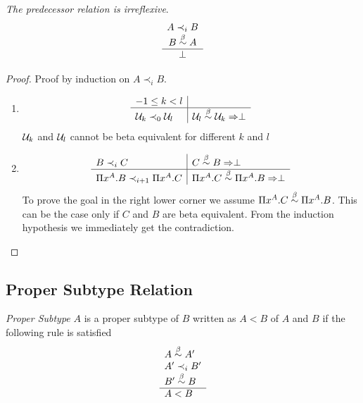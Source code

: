 \begin{lemma}
    \label{PrecedenceIrreflexive}
    \emph{The predecessor relation is irreflexive}.
    $$\begin{array}{c} A \prec_i B \\ B \stackrel{\beta}{\sim} A \\ \hline \perp\end{array}$$

    \begin{proof}
        Proof by induction on $A \prec_i B$.

        \begin{enumerate}
        \item
        $$
            \begin{array}{l|l}
                -1 \le k < l
                \\
                \hline
                {\cal U}_k \prec_0 {\cal U}_l
                &
                {\cal U}_l \stackrel{\beta}{\sim} {\cal U}_k \Rightarrow \perp
            \end{array}
        $$
        ${\cal U}_k$ and ${\cal U}_l$ cannot be beta equivalent for different $k$ and $l$


        \item
        $$
            \begin{array}{l|l}
                B \prec_i C
                &
                C \stackrel{\beta}{\sim} B \Rightarrow \perp
                \\
                \hline
                \Pi x^A. B \prec_{i+1} \Pi x^A. C
                &
                \Pi x^A. C \stackrel{\beta}{\sim} \Pi x^A. B \Rightarrow \perp
            \end{array}
        $$
        To prove the goal in the right lower corner we assume $\Pi x^A. C
        \stackrel{\beta}{\sim} \Pi x^A.B$. This can be the case only if $C$ and $B$ are
        beta equivalent. From the induction hypothesis we immediately
        get the contradiction.
        \end{enumerate}
    \end{proof}
\end{lemma}








\subsection{Proper Subtype Relation}



\begin{definition}
    \emph{Proper Subtype}
    $A$ is a proper subtype of $B$ written as $A < B$
    of $A$ and $B$ if the following rule is satisfied
    $$
    \begin{array}{l} 
        A \stackrel{\beta}{\sim} A'
        \\
        A' \prec_i B'
        \\
        B' \stackrel{\beta}{\sim} B
     \\ \hline 
        A < B
    \end{array}
    $$
\end{definition}




